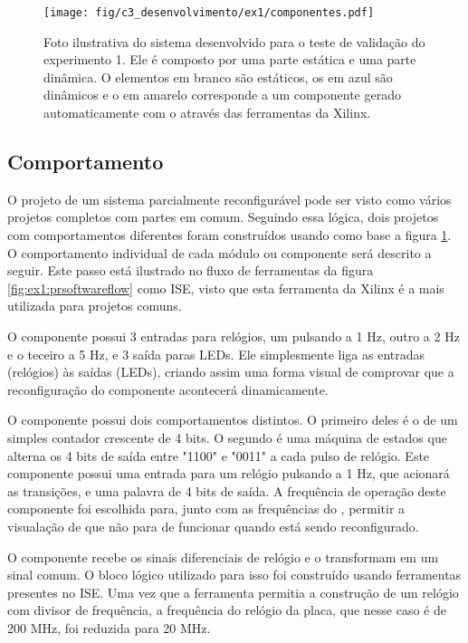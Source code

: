 \documentclass[11pt,a4paper,oneside]{book}
\begin{document}
\begin{figure}[h]
\centering
\texttt{[image: fig/c3\_desenvolvimento/ex1/componentes.pdf]}
\caption{Foto ilustrativa do sistema desenvolvido para o teste de validação do experimento 1. Ele é composto por uma parte estática e uma parte dinâmica. O elementos em branco são estáticos, os em azul são dinâmicos e o em amarelo corresponde a um componente gerado automaticamente com o através das ferramentas da Xilinx.}
\label{fig:ex1:componentes}
\end{figure}

\subsection{Comportamento}
O projeto de um sistema parcialmente reconfigurável pode ser visto como vários projetos completos com partes em comum.
Seguindo essa lógica, dois projetos com comportamentos diferentes foram construídos usando como base a figura \ref{fig:ex1:componentes}.
O comportamento individual de cada módulo ou componente será descrito a seguir.
Este passo está ilustrado no fluxo de ferramentas da figura \ref{fig:ex1:prsoftwareflow} como ISE, visto que esta ferramenta da Xilinx é a mais utilizada para projetos comuns.

O componente  possui 3 entradas para relógios, um pulsando a 1 Hz, outro a 2 Hz e o teceiro a 5 Hz, e 3 saída paras LEDs.
Ele simplesmente liga as entradas (relógios) às saídas (LEDs), criando assim uma forma visual de comprovar que a reconfiguração do componente  acontecerá dinamicamente.

O componente  possui dois comportamentos distintos.
O primeiro deles é o de um simples contador crescente de 4 bits.
O segundo é uma máquina de estados que alterna os 4 bits de saída entre "1100" e "0011" a cada pulso de relógio.
Este componente possui uma entrada para um relógio pulsando a 1 Hz, que acionará as transições, e uma palavra de 4 bits de saída.
A frequência de operação deste componente foi escolhida para, junto com as frequências do , permitir a visualação de que  não para de funcionar quando  está sendo reconfigurado.

O componente  recebe os sinais diferenciais de relógio e o transformam em um sinal comum.
O bloco lógico utilizado para isso foi construído usando ferramentas presentes no ISE.
Uma vez que a ferramenta permitia a construção de um relógio com divisor de frequência, a frequência do relógio da placa, que nesse caso é de 200 MHz, foi reduzida para 20 MHz.
\end{document}
